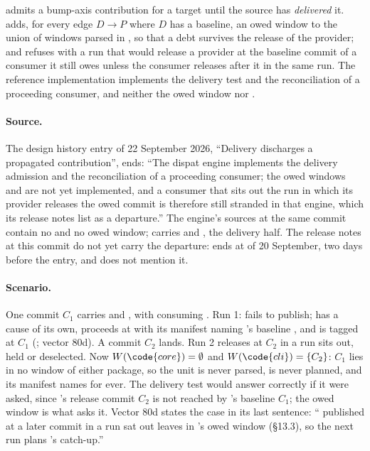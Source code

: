 \begin{obligation}
\label{ob:owed}
 admits a bump-axis contribution for a target until the source
has \emph{delivered} it.  adds, for every edge $D \to P$ where $D$
has a baseline, an owed window  to the union of
windows parsed in , so that a debt survives the release of the
provider; and  refuses with  a run that would release a
provider at the baseline commit of a consumer it still owes unless the
consumer releases after it in the same run. The reference implementation
implements the delivery test and the reconciliation of a proceeding consumer,
and neither the owed window nor .
\end{obligation}

\paragraph{Source.} The design history entry of 22 September 2026,
``Delivery discharges a propagated contribution'', ends: ``The dispat engine
implements the delivery admission and the reconciliation of a proceeding
consumer; the owed windows and  are not yet implemented, and a
consumer that sits out the run in which its provider releases the owed commit
is therefore still stranded in that engine, which its release notes list as a
departure.'' The engine's sources at the same commit contain no 
and no owed window;  carries  and
, the delivery half. The release notes at this commit do
not yet carry the departure:  ends at
 of 20 September, two days before the entry, and
 does not mention it.

\paragraph{Scenario.} One commit $C_1$ carries  and
, with  consuming . Run 1:
 fails to publish;  has a cause of its own, proceeds at
 with its manifest naming 's baseline ,
and is tagged at $C_1$ (; vector 80d). A commit $C_2$ lands. Run 2
releases  at $C_2$ in a run  sits out, held or
deselected. Now $W(\code{core}) = \emptyset$ and $W(\code{cli}) = \{C_2\}$:
$C_1$ lies in no window of either package, so the unit is never parsed,
 is never planned, and its manifest names  for
ever. The delivery test would answer correctly if it were asked, since
's release commit $C_2$ is not reached by 's baseline
$C_1$; the owed window is what asks it. Vector 80d states the case in its
last sentence: `` published at a later commit in a run 
sat out leaves  in 's owed window (\S13.3), so the next run
plans 's catch-up.''

